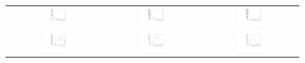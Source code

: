 \begin{figure}
\centering
\begin{tabular}{ccc}
\includegraphics[width=0.3\textwidth]{ANA_resources/Plots/Monte_carlo/data_vs_MC/Kpi/acos(Bd_DIRA_OWNPV)_2016.pdf} & \includegraphics[width=0.3\textwidth]{ANA_resources/Plots/Monte_carlo/data_vs_MC/Kpi/Bd_IPCHI2_OWNPV_2016.pdf} & \includegraphics[width=0.3\textwidth]{ANA_resources/Plots/Monte_carlo/data_vs_MC/Kpi/Bd_LOKI_VFASPF_VCHI2VDOF_2016.pdf} \\
\includegraphics[width=0.3\textwidth]{ANA_resources/Plots/Monte_carlo/data_vs_MC/Kpi/Bd_ptasy_1_50_2016.pdf} & \includegraphics[width=0.3\textwidth]{ANA_resources/Plots/Monte_carlo/data_vs_MC/Kpi/log10(D0_IPCHI2_OWNPV)_2016.pdf} & \includegraphics[width=0.3\textwidth]{ANA_resources/Plots/Monte_carlo/data_vs_MC/Kpi/log10(KstarK_IPCHI2_OWNPV)_2016.pdf} \\

\end{tabular}
\end{figure}
